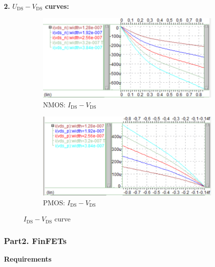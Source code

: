 \documentclass[UTF8,12pt,a4paper]{article}
\begin{document}
\textbf{2.} $U_{\text{DS}}-V_{\text{DS}}$ \textbf{curves:}
\begin{figure}[htbp]
    \centering
    \begin{subfigure}[b]{0.45\textwidth} %
        \centering
        \includegraphics[width=\textwidth]{figure/wv_Task1_Bulk_NMOS_white.png} %
        \caption{NMOS: $I_{\text{DS}}-V_{\text{DS}}$}
        \label{fig:NMOS_I_V}
    \end{subfigure}
    \hfill %
    \begin{subfigure}[b]{0.45\textwidth}
        \centering
        \includegraphics[width=\textwidth]{figure/wv_Task1_Bulk_PMOS_white.png} %
        \caption{PMOS: $I_{\text{DS}}-V_{\text{DS}}$}
        \label{fig:PMOS_I_V}
    \end{subfigure}
    \caption{$I_{\text{DS}}-V_{\text{DS}}$ curve}
    \label{fig:bulk_IV}
\end{figure}


\subsubsection{Part2. FinFETs}

\textbf{Requirements}
\end{document}
